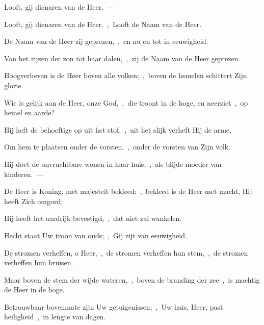 \documentclass[12pt,twoside,a5paper]{article}
\begin{document}
\begin{halfparskip}
   Looft, gij dienaren van de Heer.~--- 

  Looft, gij dienaren van de Heer.~\sep\ Looft de Naam van de Heer.

  De Naam van de Heer zij geprezen,~\sep\ en nu en tot in eeuwigheid.

  Van het rijzen der zon tot haar dalen,~\sep\ zij de Naam van de Heer geprezen.

  Hoogverheven is de Heer boven alle volken;~\sep\ boven de hemelen schittert Zijn glorie.

  Wie is gelijk aan de Heer, onze God,~\sep\ die troont in de hoge, en neerziet~\sep\ op hemel en aarde?

  Hij heft de behoeftige op uit het stof,~\sep\ uit het slijk verheft Hij de arme,

  Om hem te plaatsen onder de vorsten,~\sep\ onder de vorsten van Zijn volk.

  Hij doet de onvruchtbare wonen in haar huis,~\sep\ als blijde moeder van kinderen.~--- 
\end{halfparskip}

\begin{halfparskip}

   De Heer is Koning, met majesteit bekleed;~\sep\ bekleed is de Heer met macht, Hij heeft Zich omgord;

  Hij heeft het aardrijk bevestigd,~\sep\ dat niet zal wankelen.

  Hecht staat Uw troon van ouds;~\sep\ Gij zijt van eeuwigheid.

  De stromen verheffen, o Heer,~\sep\ de stromen verheffen hun stem,~\sep\ de stromen verheffen hun bruisen.

  Maar boven de stem der wijde wateren,~\sep\ boven de branding der zee~\sep\ is machtig de Heer in de hoge.

  Betrouwbaar bovenmate zijn Uw getuigenissen;~\sep\ Uw huis, Heer, past heiligheid~\sep\ in lengte van dagen.
\end{halfparskip}
\end{document}
